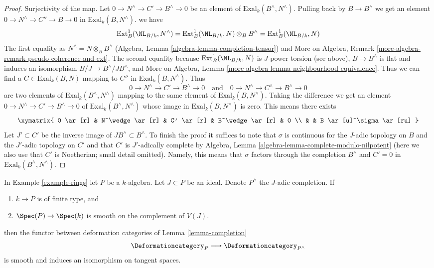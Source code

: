 \begin{proof}
\medskip\noindent
Surjectivity of the map. Let $0 \to N^\wedge \to C' \to B^\wedge \to 0$
be an element of $\text{Exal}_k(B^\wedge, N^\wedge)$.
Pulling back by $B \to B^\wedge$ we get an element
$0 \to N^\wedge \to C'' \to B \to 0$ in
$\text{Exal}_k(B, N^\wedge)$.
we have
$$
\text{Ext}^1_B(\NL_{B/k}, N^\wedge) =
\text{Ext}^1_B(\NL_{B/k}, N) \otimes_B B^\wedge =
\text{Ext}^1_B(\NL_{B/k}, N)
$$
The first equality as $N^\wedge = N \otimes_B B^\wedge$
(Algebra, Lemma \ref{algebra-lemma-completion-tensor})
and
More on Algebra, Remark \ref{more-algebra-remark-pseudo-coherence-and-ext}.
The second equality because $\text{Ext}^1_B(\NL_{B/k}, N)$
is $J$-power torsion (see above), $B \to B^\wedge$ is flat and induces
an isomorphism $B/J \to B^\wedge/JB^\wedge$, and
More on Algebra, Lemma \ref{more-algebra-lemma-neighbourhood-equivalence}.
Thus we can find a $C \in \text{Exal}_k(B, N)$ mapping to $C''$ in
$\text{Exal}_k(B, N^\wedge)$.
Thus
$$
0 \to N^\wedge \to C' \to B^\wedge \to 0
\quad\text{and}\quad
0 \to N^\wedge \to C^\wedge \to B^\wedge \to 0
$$
are two elements of $\text{Exal}_k(B^\wedge, N^\wedge)$
mapping to the same element of $\text{Exal}_k(B, N^\wedge)$.
Taking the difference we get an element
$0 \to N^\wedge \to C' \to B^\wedge \to 0$ of
$\text{Exal}_k(B^\wedge, N^\wedge)$
whose image in $\text{Exal}_k(B, N^\wedge)$ is zero.
This means there exists
$$
\xymatrix{
0 \ar[r] &
N^\wedge \ar[r] &
C' \ar[r] &
B^\wedge \ar[r] & 0 \\
& & B \ar[u]^\sigma \ar[ru]
}
$$
Let $J' \subset C'$ be the inverse image of $JB^\wedge \subset B^\wedge$.
To finish the proof it suffices to note that
$\sigma$ is continuous for the $J$-adic topology on $B$
and the $J'$-adic topology on $C'$ and that $C'$ is $J'$-adically complete by
Algebra, Lemma \ref{algebra-lemma-complete-modulo-nilpotent}
(here we also use that $C'$ is Noetherian; small detail omitted).
Namely, this means that $\sigma$ factors through the
completion $B^\wedge$ and $C' = 0$ in $\text{Exal}_k(B^\wedge, N^\wedge)$.
\end{proof}

\begin{lemma}
\label{lemma-smooth-completion}
In Example \ref{example-rings} let $P$ be a $k$-algebra.
Let $J \subset P$ be an ideal.
Denote $P^\wedge$ the $J$-adic completion. If
\begin{enumerate}
\item $k \to P$ is of finite type, and
\item $\Spec(P) \to \Spec(k)$ is smooth on the complement of $V(J)$.
\end{enumerate}
then the functor between deformation categories of
Lemma \ref{lemma-completion}
$$
\Deformationcategory_P \longrightarrow \Deformationcategory_{P^\wedge}
$$
is smooth and induces an isomorphism on tangent spaces.
\end{lemma}


